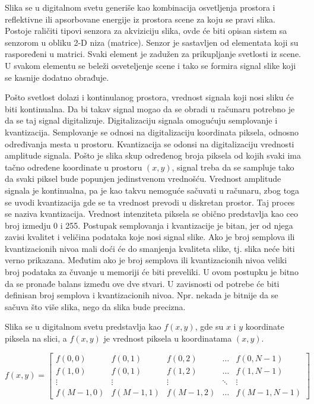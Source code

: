 \documentclass[a4paper,12pt,titlepage]{article}
\begin{document}
Slika se u digitalnom svetu generiše kao kombinacija osvetljenja prostora i reflektivne ili apsorbovane energije iz prostora scene za koju se pravi slika. Postoje raličiti tipovi senzora za akviziciju slika, ovde će biti opisan sistem sa senzorom u obliku 2-D niza (matrice). Senzor je sastavljen od elementata koji su raspoređeni u matrici. Svaki element je zadužen za prikupljanje svetlosti iz scene. U svakom elementu se beleži osveteljenje scene i tako se formira signal slike koji se kasnije dodatno obrađuje.

Pošto svetlost dolazi i kontinulanog prostora, vrednost signala koji nosi sliku će biti kontinualna. Da bi takav signal mogao da se obradi u računaru potrebno je da se taj signal digitalizuje. Digitalizaciju signala omogućuju semplovanje i kvantizacija. Semplovanje se odnosi na digitalizaciju koordinata piksela, odnosno određivanja mesta u prostoru. Kvantizacija se odonsi na digitalizaciju vrednosti amplitude signala. Pošto je slika skup određenog broja piksela od kojih svaki ima tačno određene koordinate u prostoru $(x, y)$, signal treba da se sampluje tako da svaki piksel bude popunjen jedinstvenom vrednošću. Vrednost amplitude signala je kontinualna, pa je kao takvu nemoguće sačuvati u računaru, zbog toga se uvodi kvantizacija gde se ta vrednost prevodi u diskretan prostor. Taj proces se naziva kvantizacija. Vrednost intenziteta piksela se obično predstavlja kao ceo broj izmedju 0 i 255. Postupak semplovanja i kvantizacije je bitan, jer od njega zavisi kvalitet i veličina podataka koje nosi signal slike. Ako je broj semplova ili kvantizacionih nivoa mali doći će do smanjenja kvaliteta slike, tj. slika neće biti verno prikazana. Međutim ako je broj  semplova ili kvantizacionih nivoa veliki broj podataka za čuvanje u memoriji će biti preveliki. U ovom postupku je bitno da se pronađe balans između ove dve stvari. U zavisnosti od potrebe će biti definisan broj semplova i kvantizacionih nivoa. Npr. nekada je bitnije da se sačuva što više slika, nego da slika bude precizna.  

Slika se u digitalnom svetu predstavlja kao $f(x, y)$, gde su $x$ i $y$ koordinate piksela na slici, a $f(x, y)$ je vrednost piksela u koordinatama $(x, y)$. 

\[
f(x, y)
=
\begin{bmatrix}
    f(0, 0) & f(0, 1) & f(0, 2) & \dots  & f(0, N - 1) \\
    f(1, 0) & f(0, 1) & f(1, 2) & \dots  & f(1, N - 1) \\
    \vdots & \vdots & \vdots & \ddots & \vdots \\
    f(M - 1, 0) & f(M - 1, 1) & f(M - 1, 2) & \dots  & f(M - 1, N - 1)
\end{bmatrix}
\]
\end{document}
